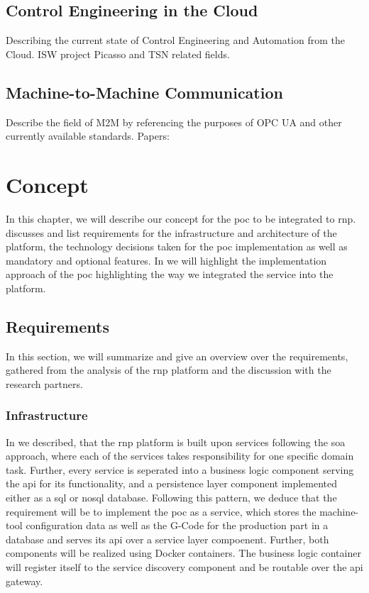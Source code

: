 \documentclass[
a4paper,
twoside,
headsepline,
cleardoublepage=empty,
parskip=half,
draft=false
]{scrbook}
\begin{document}
		\section{Control Engineering in the Cloud}\label{sec:control_engineering_in_the_cloud}
		
			Describing the current state of Control Engineering and Automation from the Cloud.
			ISW project Picasso and TSN related fields.
		
		\section{Machine-to-Machine Communication}\label{sec:machine_to_machine_communication}
		
			Describe the field of M2M by referencing the purposes of OPC UA and other currently available standards. Papers:
				
	\chapter{Concept} \label{ch:concept}
	
		In this chapter, we will describe our concept for the \gls{poc} to be integrated to \gls{rnp}.
		 discusses and list requirements for the infrastructure and architecture of the platform, the technology decisions taken for the \gls{poc} implementation as well as mandatory and optional features. In  we will highlight the implementation approach of the \gls{poc} highlighting the way we integrated the service into the platform. 
		
		\section{Requirements} \label{sec:requirements}
		
			In this section, we will summarize and give an overview over the requirements, gathered from the analysis of the \gls{rnp} platform and the discussion with the research partners.
		
			\subsection{Infrastructure} \label{subsec:infrastructure}
			
				In  we described, that the \gls{rnp} platform is built upon services following the \gls{soa} approach, where each of the services takes responsibility for one specific domain task.
				Further, every service is seperated into a business logic component serving the \gls{api} for its functionality, and a persistence layer component implemented either as a \gls{sql} or \gls{nosql} database.
				Following this pattern, we deduce that the requirement will be to implement the \gls{poc} as a service, which stores the machine-tool configuration data as well as the G-Code for the production part in a database and serves its \gls{api} over a service layer compoenent.
				Further, both components will be realized using Docker containers.
				The business logic container will register itself to the service discovery component and be routable over the \gls{api} gateway.
			
\end{document}
